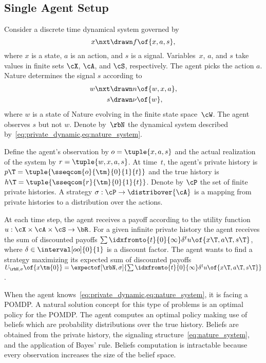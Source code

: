 \subsection{Single Agent Setup}

Consider a discrete time dynamical system governed by
\begin{equation}
\label{eq:private_dynamic}
x\nxt \drawn  f \of{x, a, s},
\end{equation}
where \(x\) is a state, \(a\) is an action, and \(s\) is a signal.
Variables~\(x\), \(a\), and \(s\) take values in finite sets \(\cX\), \(\cA\), and \(\cS\), respectively.
The agent picks the action \(a\).
Nature determines the signal \(s\) according to
\begin{subequations}
\label{eq:nature_system}
\begin{align}
\label{eq:nature_dynamic}
w\nxt &\drawn n \of{w, x, a}, \\
\label{eq:nature_signal}
s &\drawn \nu \of{w},
\end{align}
\end{subequations}
where \(w\) is a state of Nature evolving in the finite state space~\(\cW\).
The agent observes \(s\) but not \(w\).
Denote by~\(\rbN\) the dynamical system described by~\cref{eq:private_dynamic,eq:nature_system}.

Define the agent's observation by \(o = \tuple{x, a, s}\) and the actual realization of the system by \(r = \tuple{w, x, a, s}\).
At time~\(t\), the agent's private history is \(p\T = \tuple{\sseqcom{o}{\tm}{0}{1}{t}}\) and the true history is \(h\T = \tuple{\sseqcom{r}{\tm}{0}{1}{t}}\).
Denote by \(\cP\) the set of finite private histories.
A strategy \(\sigma : \cP \to \distribover{\cA}\) is a mapping from private histories to a distribution over the actions.

At each time step, the agent receives a payoff according to the utility function \(u: \cX \times \cA \times \cS \to \bR\).
For a given infinite private history the agent receives the sum of discounted payoffs \(\sum\idxfromto{t}{0}{\infty} \delta^t u \of{x\T, a\T, s\T}\), where \(\delta \in \interval[oo]{0}{1}\) is a discount factor.
The agent wants to find a strategy maximizing its expected sum of discounted payoffs \(U\params{\rbN, \sigma}\of{x\tm{0}} = \expectof[\rbN, \sigma]{\sum\idxfromto{t}{0}{\infty} \delta^t u \of{x\T, a\T, s\T}}\).

When the agent knows~\cref{eq:private_dynamic,eq:nature_system}, it is facing a POMDP.
A natural solution concept for this type of problems is an optimal policy for the POMDP.
The agent computes an optimal policy making use of beliefs which are probability distributions over the true history.
Beliefs are obtained from the private history, the signaling structure~\cref{eq:nature_system}, and the application of Bayes' rule.
Beliefs computation is intractable because every observation increases the size of the belief space.

